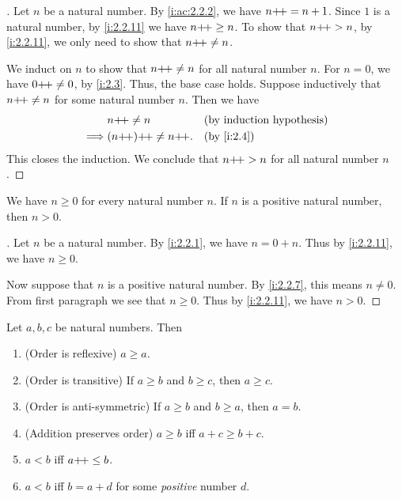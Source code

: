 \begin{proof}[]
  Let \(n\) be a natural number.
  By \cref{i:ac:2.2.2}, we have \(n{+}\!{+} = n + 1\).
  Since \(1\) is a natural number, by \cref{i:2.2.11} we have \(n{+}\!{+} \geq n\).
  To show that \(n{+}\!{+} > n\), by \cref{i:2.2.11}, we only need to show that \(n{+}\!{+} \neq n\).

  We induct on \(n\) to show that \(n{+}\!{+} \neq n\) for all natural number \(n\).
  For \(n = 0\), we have \(0{+}\!{+} \neq 0\), by \cref{i:2.3}.
  Thus, the base case holds.
  Suppose inductively that \(n{+}\!{+} \neq n\) for some natural number \(n\).
  Then we have
  \begin{align*}
             & n\pp \neq n          &  & \byIH      \\
    \implies & (n\pp)\pp \neq n\pp. &  & \by{i:2.4}
  \end{align*}
  This closes the induction.
  We conclude that \(n{+}\!{+} > n\) for all natural number \(n\).
\end{proof}

\begin{ac}\label{i:ac:2.2.4}
  We have \(n \geq 0\) for every natural number \(n\).
  If \(n\) is a positive natural number, then \(n > 0\).
\end{ac}

\begin{proof}[]
  Let \(n\) be a natural number.
  By \cref{i:2.2.1}, we have \(n = 0 + n\).
  Thus by \cref{i:2.2.11}, we have \(n \geq 0\).

  Now suppose that \(n\) is a positive natural number.
  By \cref{i:2.2.7}, this means \(n \neq 0\).
  From first paragraph we see that \(n \geq 0\).
  Thus by \cref{i:2.2.11}, we have \(n > 0\).
\end{proof}

\begin{prop}\label{i:2.2.12}
  Let \(a, b, c\) be natural numbers.
  Then
  \begin{enumerate}
    \item (Order is reflexive) \(a \geq a\).
    \item (Order is transitive) If \(a \geq b\) and \(b \geq c\), then \(a \geq c\).
    \item (Order is anti-symmetric) If \(a \geq b\) and \(b \geq a\), then \(a = b\).
    \item (Addition preserves order) \(a \geq b\) iff \(a + c \geq b + c\).
    \item \(a < b\) iff \(a{+}\!{+} \leq b\).
    \item \(a < b\) iff \(b = a + d\) for some \emph{positive} number \(d\).
  \end{enumerate}
\end{prop}

